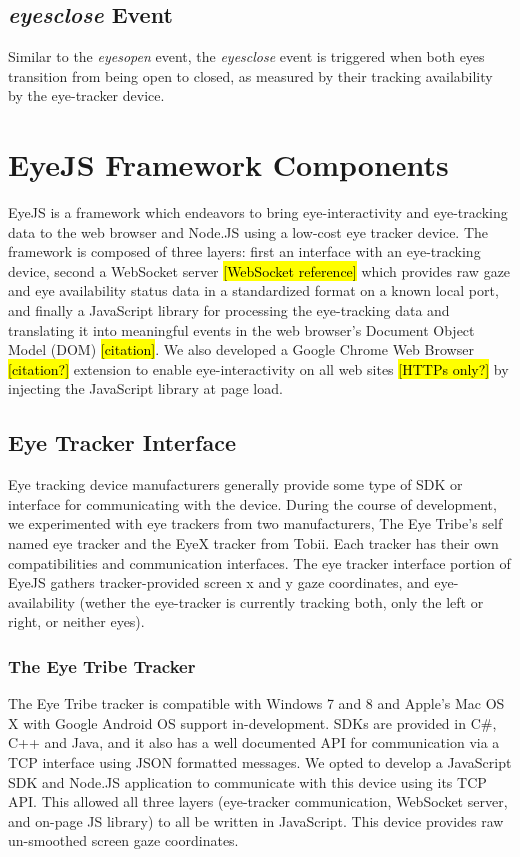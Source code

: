 \documentclass{sigchi}
\begin{document}
\subsection{\textbf{\textit{eyesclose}} Event}
Similar to the \textit{eyesopen} event, the \textit{eyesclose} event
is triggered when both eyes transition from being open to closed, as
measured by their tracking availability by the eye-tracker device.



\section{EyeJS Framework Components}
EyeJS is a framework which endeavors to bring eye-interactivity and
eye-tracking data to the web browser and Node.JS using a low-cost eye
tracker device. The framework is composed of three layers: first
an interface with an eye-tracking device, second a WebSocket server \hl{[WebSocket reference]} which provides raw gaze and eye availability
status data in a standardized format on a known local port, and finally
a JavaScript library for processing the eye-tracking data and
translating it into meaningful events in the web browser's Document
Object Model (DOM) \hl{[citation]}. We also developed a Google
Chrome Web Browser \hl{[citation?]} extension to enable
eye-interactivity on all web sites \hl{[HTTPs only?]} by injecting
the JavaScript library at page load.


\subsection{Eye Tracker Interface}
Eye tracking device manufacturers generally provide some type of SDK or
interface for communicating with the device. During the course of
development, we experimented with eye trackers from two manufacturers,
The Eye Tribe's self named eye tracker and the EyeX tracker from Tobii.
Each tracker has their own compatibilities and communication interfaces.
The eye tracker interface portion of EyeJS gathers tracker-provided
screen x and y gaze coordinates, and eye-availability (wether the
eye-tracker is currently tracking both, only the left or right, or
neither eyes).


\subsubsection{The Eye Tribe Tracker}
The Eye Tribe tracker is compatible with Windows 7 and 8 and Apple's Mac
OS X with Google Android OS support in-development. SDKs are provided
in C\#, C++ and Java, and it also has a well documented API for
communication via a TCP interface using JSON formatted messages. We
opted to develop a JavaScript SDK and Node.JS application to communicate
with this device using its TCP API. This allowed all three layers
(eye-tracker communication, WebSocket server, and on-page JS library)
to all be written in JavaScript. This device provides raw un-smoothed
screen gaze coordinates.
\end{document}
